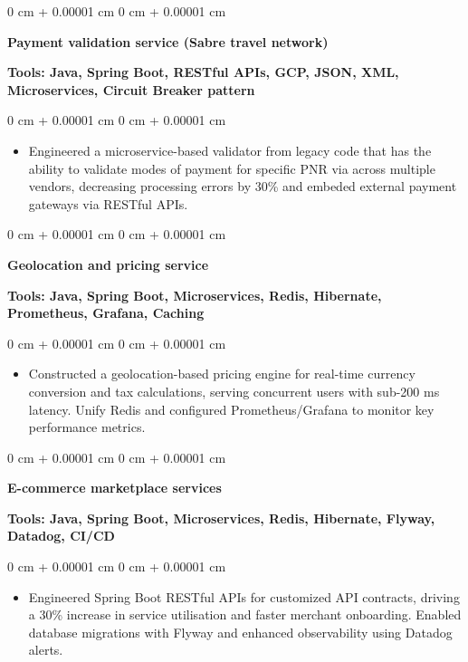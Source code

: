 \documentclass[10pt, letterpaper]{article}
\newenvironment{highlights}{
    \begin{itemize}[
        topsep=0.10 cm,
        parsep=0.10 cm,
        partopsep=0pt,
        itemsep=0pt,
        leftmargin=0 cm + 10pt
    ]
}{
    \end{itemize}
} %
\newenvironment{onecolentry}{
    \begin{adjustwidth}{
        0 cm + 0.00001 cm
    }{
        0 cm + 0.00001 cm
    }
}{
    \end{adjustwidth}
} %
\begin{document}
        \vspace{0.1 cm}
        \begin{onecolentry}
            \textbf{Payment validation service (Sabre travel network)}
        \end{onecolentry}
        \textbf{Tools: Java, Spring Boot, RESTful APIs, GCP, JSON, XML, Microservices, Circuit Breaker pattern}
        
        \vspace{0.10 cm}
        \begin{onecolentry}
            \begin{highlights}
                \item Engineered a microservice-based validator from legacy code that has the ability to validate modes of payment for specific PNR via across multiple vendors, decreasing processing errors by 30\% and embeded external payment gateways via RESTful APIs.
            \end{highlights}
        \end{onecolentry}
        
        \vspace{0.1 cm}
        \begin{onecolentry}
            \textbf{Geolocation and pricing service}
        \end{onecolentry}
        \textbf{Tools: Java, Spring Boot, Microservices, Redis, Hibernate, Prometheus, Grafana, Caching}
        \vspace{0.10 cm}
        \begin{onecolentry}
            \begin{highlights}
                \item Constructed a geolocation-based pricing engine for real-time currency conversion and tax calculations, serving concurrent users with sub-200 ms latency. Unify Redis and configured Prometheus/Grafana to monitor key performance metrics.
            \end{highlights}
        \end{onecolentry}

        \vspace{0.1 cm}

        \begin{onecolentry}
            \textbf{E-commerce marketplace services}
        \end{onecolentry}
        \textbf{Tools: Java, Spring Boot, Microservices, Redis, Hibernate, Flyway, Datadog, CI/CD}
        \vspace{0.10 cm}
        \begin{onecolentry}
            \begin{highlights}
                \item Engineered Spring Boot RESTful APIs for customized API contracts, driving a 30\% increase in service utilisation and faster merchant onboarding. Enabled database migrations with Flyway and enhanced observability using Datadog alerts.
                
            \end{highlights}
        \end{onecolentry}
    
\end{document}
